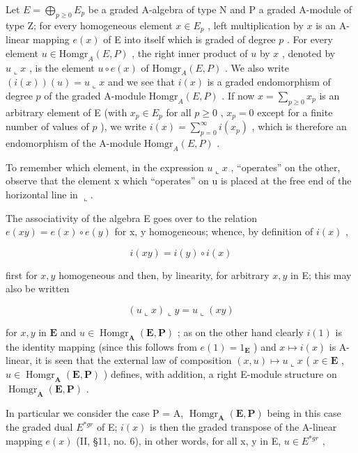 Let \(E = \bigoplus_{p \geqslant 0} E_p\) be a graded A-algebra of type N and P a graded A-module of type Z; for every homogeneous element \(x \in E_p\) , left multiplication by \(x\) is an A-linear mapping \(e(x)\) of E into itself which is graded of degree \(p\) . For every element \(u \in \text{Homgr}_A(E, P)\) , the right inner product of \(u\) by \(x\) , denoted by \(u \llcorner x\) , is the element \(u \circ e(x)\) of \(\text{Homgr}_A(E, P)\) . We also write \((i(x))(u) = u \llcorner x\) and we see that \(i(x)\) is a graded endomorphism of degree \(p\) of the graded A-module \(\text{Homgr}_A(E, P)\) . If now \(x = \sum_{p \geqslant 0} x_p\) is an arbitrary element of E (with \(x_p \in E_p\) for all \(p \geqslant 0\) , \(x_p = 0\) except for a finite number of values of \(p\) ), we write \(i(x) = \sum_{p=0}^{\infty} i(x_p)\) , which is therefore an endomorphism of the A-module \(\text{Homgr}_A(E, P)\) .

To remember which element, in the expression \(u \llcorner x\) , ``operates'' on the other, observe that the element x which ``operates'' on u is placed at the free end of the horizontal line in \(\llcorner\).

The associativity of the algebra E goes over to the relation \(e(xy) = e(x) \circ e(y)\) for x, y homogeneous; whence, by definition of \(i(x)\) ,

\[
i (x y) = i (y) \circ i (x)\tag{35}
\]

first for \(x, y\) homogeneous and then, by linearity, for arbitrary \(x, y\) in E; this may also be written

\[
(u \llcorner x) \llcorner y = u \llcorner (x y)\tag{36}
\]

for \(x, y\) in \(\mathbf{E}\) and \(u \in \operatorname{Homgr}_{\mathbf{A}}(\mathbf{E}, \mathbf{P})\) ; as on the other hand clearly \(i(1)\) is the identity mapping (since this follows from \(e(1) = 1_{\mathbf{E}}\) ) and \(x \mapsto i(x)\) is A-linear, it is seen that the external law of composition \((x, u) \mapsto u \llcorner x\) ( \(x \in \mathbf{E}\) , \(u \in \operatorname{Homgr}_{\mathbf{A}}(\mathbf{E}, \mathbf{P})\) ) defines, with addition, a right E-module structure on \(\operatorname{Homgr}_{\mathbf{A}}(\mathbf{E}, \mathbf{P})\) .

In particular we consider the case P = A, \(\operatorname{Homgr}_{\mathbf{A}}(\mathbf{E}, \mathbf{P})\) being in this case the graded dual \(E^{*gr}\) of E; \(i(x)\) is then the graded transpose of the A-linear mapping \(e(x)\) (II, §11, no. 6), in other words, for all x, y in E, \(u \in E^{*gr}\) ,

